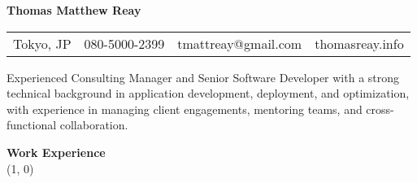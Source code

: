 \documentclass{article}
\newcommand{\heading}[1]{
	\vspace{2em}
	\textbf{\large #1} \\
	\line(1, 0){\textwidth}
	\vspace{-0.5em}
}
\begin{document}
\textbf{\huge Thomas Matthew Reay}

\vspace{1em}

\begin{tabular*}{\textwidth}{l|l|l|l}
	\hline
	Tokyo, JP & 080-5000-2399 & tmattreay@gmail.com & thomasreay.info
	\rule{0em}{1.25em} \\
\end{tabular*}

\vspace{1em}

Experienced Consulting Manager and Senior Software Developer with a strong
technical background in application development, deployment, and optimization,
with experience in managing client engagements, mentoring teams, and
cross-functional collaboration.

\heading{Work Experience}
\end{document}
